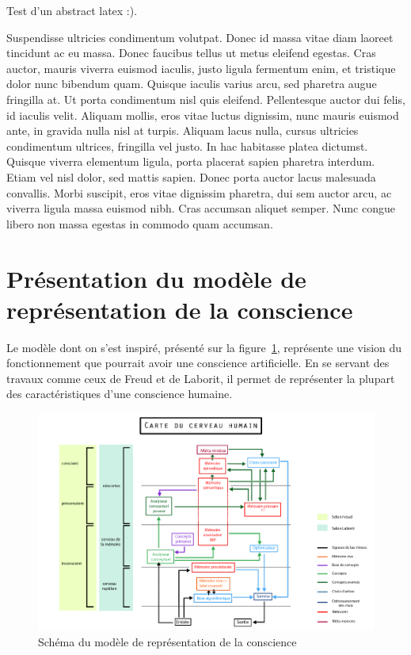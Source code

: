 \textrm{Test d'un abstract latex :).}

Suspendisse ultricies condimentum volutpat. Donec id massa vitae diam laoreet
tincidunt ac eu massa. Donec faucibus tellus ut metus eleifend egestas. Cras
auctor, mauris viverra euismod iaculis, justo ligula fermentum enim, et
tristique dolor nunc bibendum quam. Quisque iaculis varius arcu, sed pharetra
augue fringilla at. Ut porta condimentum nisl quis eleifend. Pellentesque
auctor dui felis, id iaculis velit. Aliquam mollis, eros vitae luctus dignissim,
nunc mauris euismod ante, in gravida nulla nisl at turpis. Aliquam lacus nulla,
cursus ultricies condimentum ultrices, fringilla vel justo. In hac habitasse
platea dictumst. Quisque viverra elementum ligula, porta placerat sapien
pharetra interdum. Etiam vel nisl dolor, sed mattis sapien. Donec porta auctor
lacus malesuada convallis. Morbi suscipit, eros vitae dignissim pharetra, dui
sem auctor arcu, ac viverra ligula massa euismod nibh. Cras accumsan aliquet
semper. Nunc congue libero non massa egestas in commodo quam accumsan.

\section{Présentation du modèle de représentation de la conscience}
Le modèle dont on s'est inspiré, présenté sur la figure~\ref{modele_original},
représente une vision du fonctionnement que pourrait avoir une conscience
artificielle. En se servant des travaux comme ceux de Freud et de Laborit, il permet de représenter la plupart des caractéristiques
d’une conscience humaine. 
\begin{figure}[H] 
\centering
\includegraphics[width=\textwidth]{files/modele_original} 
\caption{Schéma du modèle de représentation de la conscience} 
\label{modele_original}
\end{figure}

